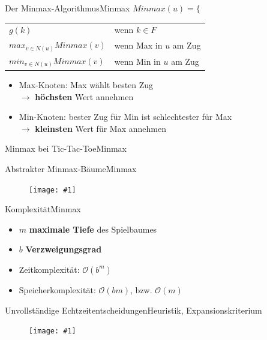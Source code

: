 \documentclass[18pt, aspectratio=169]{beamer}
\newcommand\gw[2]{%
  \begin{figure}[!ht]
  \centering
  \texttt{[image: \#1]}
  {\small#2}
  \end{figure}}
\newcommand\gh[2]{%
  \begin{figure}[!ht]
  \centering
  \texttt{[image: \#1]}
  {\small#2}
  \end{figure}}
\begin{document}
\begin{frame}{Der Minmax-Algorithmus}{Minmax}
$Minmax(u) = \Bigg\{$
	  \begin{tabular}{ll}
		  $g(k)$ & wenn $k \in F$\\
		  $max_{v \in N(u)} Minmax(v)$ & wenn Max in $u$ am Zug\\
		  $min_{v \in N(u)} Minmax(v)$ & wenn Min in $u$ am Zug
	  \end{tabular}

	  \vspace{2\baselineskip}
	  \pause

	\begin{itemize}
    \item
      Max-Knoten: Max wählt besten Zug \\
      $\rightarrow$ \textbf{höchsten} Wert annehmen
    \item
      Min-Knoten: bester Zug für Min ist schlechtester für Max \\
      $\rightarrow$ \textbf{kleinsten} Wert für Max annehmen
  \end{itemize}
\end{frame}

\begin{frame}{Minmax bei Tic-Tac-Toe}{Minmax}
	\only<1>{\gh{img/tic_minmax.pdf}{}}
	\only<2->{\gh{img/tic_minmax_2.pdf}{}}
	\pause
\end{frame}

\begin{frame}{Abstrakter Minmax-Bäume}{Minmax}
	\gw{minmax.pdf}{}
\end{frame}

\begin{frame}{Komplexität}{Minmax}
	\begin{itemize}
		\item
		  $m$ \quad \textbf{maximale Tiefe} des Spielbaumes
		\item
		  $b$ \quad \textbf{Verzweigungsgrad}
		  \pause
		\item
		  Zeitkomplexität: $\mathcal{O}(b^m)$
		\item
		  Speicherkomplexität: $\mathcal{O}(bm)$, bzw. $\mathcal{O}(m)$
	\end{itemize}
\end{frame}



\begin{frame}{Unvollständige Echtzeitentscheidungen}{Heuristik, Expansionskriterium}
  \gw{a/agenda_diagram_Echt.pdf}{}
\end{frame}
\end{document}
